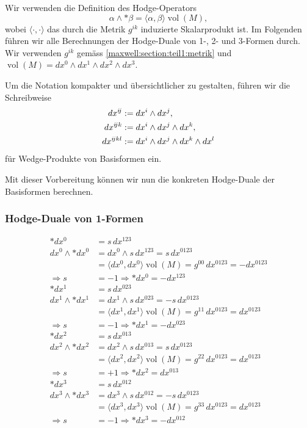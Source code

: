 Wir verwenden die Definition des Hodge-Operators
\begin{equation*}
	\alpha \wedge \ast \beta = \langle \alpha, \beta \rangle \operatorname{vol}(M),
\end{equation*}
wobei $\langle \cdot , \cdot \rangle$ das durch die Metrik $g^{ik}$ induzierte Skalarprodukt ist.
Im Folgenden führen wir alle Berechnungen der Hodge-Duale von 1-, 2- und 3-Formen durch.
Wir verwenden $g^{ik}$ gemäss \eqref{maxwell:section:teil1:metrik} und $\operatorname{vol}(M) = dx^0 \wedge dx^1 \wedge dx^2 \wedge dx^3$.
\begin{definition}
Um die Notation kompakter und übersichtlicher zu gestalten, führen wir die Schreibweise
\begin{align}
	dx^{i\!j} &:= dx^i \wedge dx^j, 
	\label{maxwell:hodge:zwei}
	\\
	dx^{i\!jk} &:= dx^i \wedge dx^j \wedge dx^k, 
	\label{maxwell:hodge:drei}
	\\
	dx^{i\!jkl} & := dx^i \wedge dx^j \wedge dx^k \wedge dx^l
	\notag
\end{align}
für Wedge-Produkte von Basisformen ein.
\end{definition}
Mit dieser Vorbereitung können wir nun die konkreten Hodge-Duale der Basisformen berechnen.
\subsubsection{Hodge-Duale von 1-Formen}
\begin{align*}
	\ast dx^0 
	&= s \, dx^{123} \\
	dx^0 \wedge \ast dx^0 
	&= dx^0 \wedge s \, dx^{123} = s \, dx^{0123} \\
	&= \langle dx^0, dx^0 \rangle \operatorname{vol}(M) = g^{00} \, dx^{0123} = -dx^{0123} \\
	\Rightarrow s &= -1 \Rightarrow \boxed{\ast dx^0 = - dx^{123}}
	\\[1em]
	\ast dx^1 
	&= s \, dx^{023} \\
	dx^1 \wedge \ast dx^1 
	&= dx^1 \wedge s \, dx^{023} = -s \, dx^{0123} \\
	&= \langle dx^1, dx^1 \rangle \operatorname{vol}(M) = g^{11} \, dx^{0123} = dx^{0123} \\
	\Rightarrow s &= -1 \Rightarrow \boxed{\ast dx^1 = - dx^{023}}
	\\[1em]
	\ast dx^2 
	&= s \, dx^{013} \\
	dx^2 \wedge \ast dx^2 
	&= dx^2 \wedge s \, dx^{013} = s \, dx^{0123} \\
	&= \langle dx^2, dx^2 \rangle \operatorname{vol}(M) = g^{22} \, dx^{0123} = dx^{0123} \\
	\Rightarrow s &= +1 \Rightarrow \boxed{\ast dx^2 = dx^{013}}
	\\[1em]
	\ast dx^3 
	&= s \, dx^{012} \\
	dx^3 \wedge \ast dx^3 
	&= dx^3 \wedge s \, dx^{012} = -s \, dx^{0123} \\
	&= \langle dx^3, dx^3 \rangle \operatorname{vol}(M) = g^{33} \, dx^{0123} = dx^{0123} \\
	\Rightarrow s &= -1 \Rightarrow \boxed{\ast dx^3 = - dx^{012}}
\end{align*}

